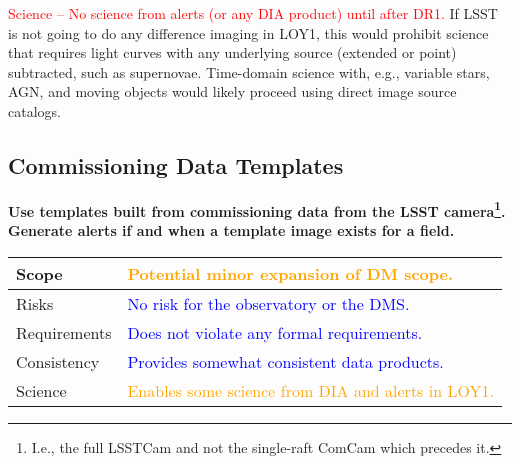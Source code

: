 \documentclass[DM,lsstdraft,toc]{lsstdoc}
\begin{document}
\textcolor{red}{ Science -- No science from alerts (or any DIA product) until after DR1.}
If LSST is not going to do any difference imaging in LOY1, this would prohibit science that requires light curves with any underlying source (extended or point) subtracted, such as supernovae.
Time-domain science with, e.g., variable stars, AGN, and moving objects would likely proceed using direct image source catalogs. 


\clearpage
\subsection{Commissioning Data Templates}\label{ssec:potsol_comm}

{\bf Use templates built from commissioning data from the LSST camera\footnote{I.e., the full LSSTCam and not the single-raft ComCam which precedes it.}. Generate alerts if and when a template image exists for a field.}

\begin{center}
\begin{tabular}{|p{2.5cm}|p{13cm}|}
\hline
Scope & \textcolor{orange}{Potential minor expansion of DM scope.}   \\
\hline
Risks & \textcolor{blue}{No risk for the observatory or the DMS.} \\
\hline
Requirements & \textcolor{blue}{Does not violate any formal requirements.} \\
\hline
Consistency & \textcolor{blue}{Provides somewhat consistent data products.}  \\
\hline
Science & \textcolor{orange}{Enables some science from DIA and alerts in LOY1.} \\
\hline
\end{tabular}
\end{center}
\end{document}
